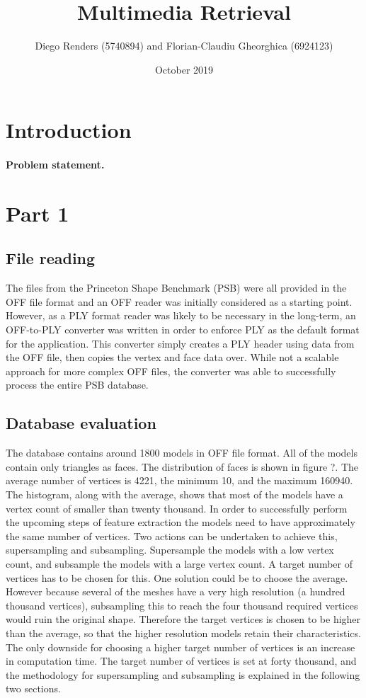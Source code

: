 \documentclass{bigdata}
\title{Multimedia Retrieval}
\author{Diego Renders (5740894) and Florian-Claudiu Gheorghica (6924123)}
\date{October 2019}
\begin{document}
\maketitle

\section{Introduction}

\paragraph*{Problem statement.}

\newpage

\section{Part 1}

\subsection{File reading}

The files from the Princeton Shape Benchmark (PSB) were all provided in the OFF file format and an OFF reader was initially considered as a starting point. However, as a PLY format reader was likely to be necessary in the long-term, an OFF-to-PLY converter was written in order to enforce PLY as the default format for the application.
This converter simply creates a PLY header using data from the OFF file, then copies the vertex and face data over. While not a scalable approach for more complex OFF files, the converter was able to successfully process the entire PSB database.

\subsection{Database evaluation}
The database contains around 1800 models in OFF file format. All of the models contain only triangles as faces. The distribution of faces is shown in figure ?. The average number of vertices is 4221, the minimum 10, and the maximum 160940. The histogram, along with the average, shows that most of the models have a vertex count of smaller than twenty thousand. In order to successfully perform the upcoming steps of feature extraction the models need to have approximately the same number of vertices. Two actions can be undertaken to achieve this, supersampling and subsampling. Supersample the models with a low vertex count, and subsample the models with a large vertex count. A target number of vertices has to be chosen for this. One solution could be to choose the average. However because several of the meshes have a very high resolution (a hundred thousand vertices), subsampling this to reach the four thousand required vertices would ruin the original shape. Therefore the target vertices is chosen to be higher than the average, so that the higher resolution models retain their characteristics. The only downside for choosing a higher target number of vertices is an increase in computation time. The target number of vertices is set at forty thousand, and the methodology for supersampling and subsampling is explained in the following two sections.
\end{document}
